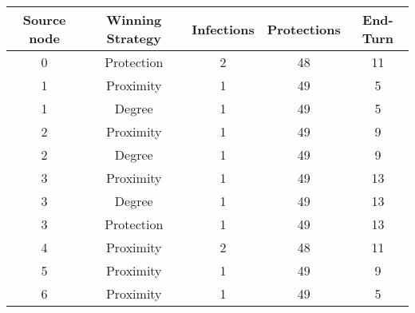 \documentclass[results.tex]{subfiles}
\begin{document}
    \begin{center}
        \begin{tabular}{| c || c | c | c | c |}
            \hline
            {\bfseries Source node} & {\bfseries Winning Strategy} & {\bfseries Infections} & {\bfseries Protections}
            & {\bfseries End-Turn}
            \\  %
            \hline\hline
            0                       & Protection                   & 2                      & 48                      & 11                   \\
            \hline
            1                       & Proximity                    & 1                      & 49                      & 5                    \\
            \hline
            1                       & Degree                       & 1                      & 49                      & 5                    \\
            \hline
            2                       & Proximity                    & 1                      & 49                      & 9                    \\
            \hline
            2                       & Degree                       & 1                      & 49                      & 9                    \\
            \hline
            3                       & Proximity                    & 1                      & 49                      & 13                   \\
            \hline
            3                       & Degree                       & 1                      & 49                      & 13                   \\
            \hline
            3                       & Protection                   & 1                      & 49                      & 13                   \\
            \hline
            4                       & Proximity                    & 2                      & 48                      & 11                   \\
            \hline
            5                       & Proximity                    & 1                      & 49                      & 9                    \\
            \hline
            6                       & Proximity                    & 1                      & 49                      & 5                    \\

\end{tabular}
\end{center}
\end{document}
